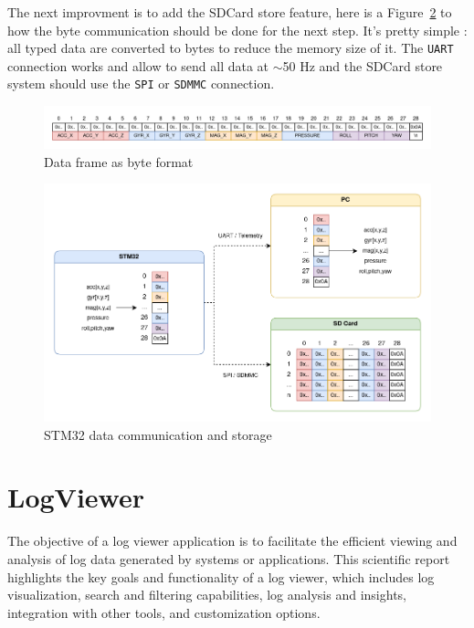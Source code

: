 
The next improvment is to add the SDCard store feature, here is a Figure~\ref{fig:project_store} to how the byte communication should be done for the next step.
It's pretty simple : all typed data are converted to bytes to reduce the memory size of it. The \texttt{UART} connection works and allow to send all data at $\sim$50 Hz and the SDCard store system should use the \texttt{SPI} or \texttt{SDMMC} connection.
\begin{figure}[H]
    \centering
    \includegraphics[width=\linewidth]{./projects/pmodnav/frame_description.png}
    \caption{Data frame as byte format}
    \label{fig:frame_description}
\end{figure}

\begin{figure}[H]
    \centering
    \includegraphics[width=0.75\linewidth]{./projects/pmodnav/project_store.png}
    \caption{STM32 data communication and storage}
    \label{fig:project_store}
\end{figure}

\section{LogViewer}
The objective of a log viewer application is to facilitate the efficient viewing and analysis of log data generated by systems or applications.
This scientific report highlights the key goals and functionality of a log viewer, which includes log visualization, search and filtering capabilities, log analysis and insights, integration with other tools, and customization options.
